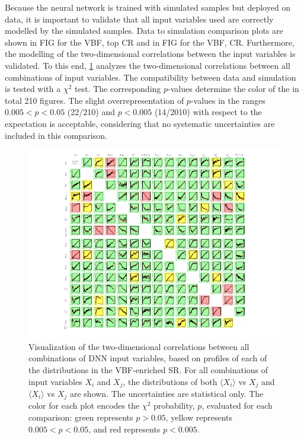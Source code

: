 Because the neural network is trained with simulated samples but deployed on data, it is important to validate that all input variables used are correctly modelled by the simulated samples.
Data to simulation comparison plots are shown in FIG for the VBF, top CR and in FIG for the VBF, \Ztautau CR. 
Furthermore, the modelling of the two-dimensional correlations between the input variables is validated.
To this end, \cref{fig:dnn-features-profiles} analyzes the two-dimensional correlations between all combinations of input variables. The compatibility between data and simulation is tested with a $\chi^2$ test. 
The corresponding $p$-values determine the color of the in total 210 figures.
The slight overrepresentation of $p$-values in the ranges $0.005 < p < 0.05$ (22/210) and $p < 0.005$ (14/2010) with respect to the expectation is acceptable, considering that no systematic uncertainties are included in this comparison. 

\begin{figure}[t]
    \includegraphics[width=\textwidth,trim=45 0 45 0]{figures/hww/dnn/correlations_PROF_SR.pdf}
    \caption{Visualization of the two-dimensional correlations between all combinations of DNN input variables, based on profiles of each of the distributions in the VBF-enriched \TwoJet SR. For all combinations of input variables $X_i$ and $X_j$, the distributions of both $\langle X_i \rangle$ vs $X_j$ and $\langle X_i \rangle$ vs $X_j$ are shown. The uncertainties are statistical only. The color for each plot encodes the $\chi^2$ probability, $p$, evaluated for each comparison: green represents $p > 0.05$, yellow represents $0.005 < p < 0.05$, and red represents $p < 0.005$.}
    \label{fig:dnn-features-profiles}
\end{figure}


